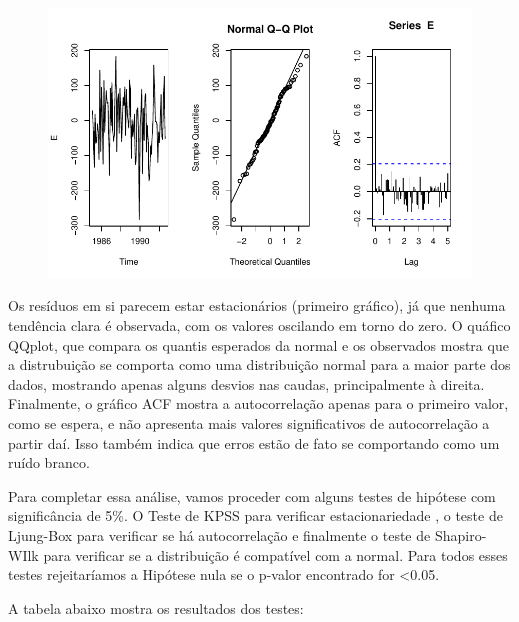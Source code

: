 \documentclass[
  letterpaper,
  DIV=11,
  numbers=noendperiod]{scrartcl}
\begin{document}
\begin{figure}[H]

{\centering \includegraphics{Trabalhao1_ST_grupo5_2023_05_16_files/figure-pdf/unnamed-chunk-15-1.pdf}

}

\end{figure}

Os resíduos em si parecem estar estacionários (primeiro gráfico), já que
nenhuma tendência clara é observada, com os valores oscilando em torno
do zero. O quáfico QQplot, que compara os quantis esperados da normal e
os observados mostra que a distrubuição se comporta como uma
distribuição normal para a maior parte dos dados, mostrando apenas
alguns desvios nas caudas, principalmente à direita. Finalmente, o
gráfico ACF mostra a autocorrelação apenas para o primeiro valor, como
se espera, e não apresenta mais valores significativos de autocorrelação
a partir daí. Isso também indica que erros estão de fato se comportando
como um ruído branco.

Para completar essa análise, vamos proceder com alguns testes de
hipótese com significância de 5\%. O Teste de KPSS para verificar
estacionariedade , o teste de Ljung-Box para verificar se há
autocorrelação e finalmente o teste de Shapiro-WIlk para verificar se a
distribuição é compatível com a normal. Para todos esses testes
rejeitaríamos a Hipótese nula se o p-valor encontrado for \textless0.05.

A tabela abaixo mostra os resultados dos testes:
\end{document}
